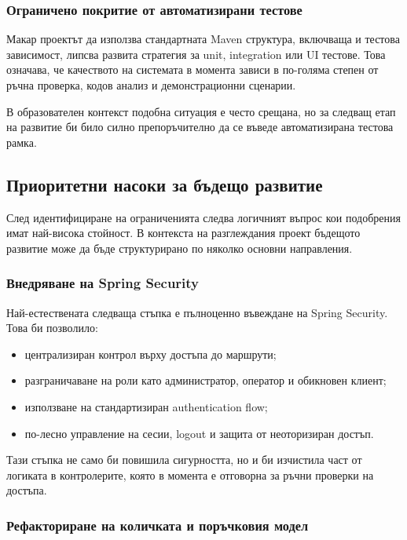 \subsubsection{Ограничено покритие от автоматизирани тестове}

Макар проектът да използва стандартната Maven структура, включваща и тестова зависимост, липсва развита стратегия за unit, integration или UI тестове. Това означава, че качеството на системата в момента зависи в по-голяма степен от ръчна проверка, кодов анализ и демонстрационни сценарии.

В образователен контекст подобна ситуация е често срещана, но за следващ етап на развитие би било силно препоръчително да се въведе автоматизирана тестова рамка.

\subsection{Приоритетни насоки за бъдещо развитие}

След идентифициране на ограниченията следва логичният въпрос кои подобрения имат най-висока стойност. В контекста на разглеждания проект бъдещото развитие може да бъде структурирано по няколко основни направления.

\subsubsection{Внедряване на Spring Security}

Най-естествената следваща стъпка е пълноценно въвеждане на Spring Security. Това би позволило:

\begin{itemize}[leftmargin=*]
    \item централизиран контрол върху достъпа до маршрути;
    \item разграничаване на роли като администратор, оператор и обикновен клиент;
    \item използване на стандартизиран authentication flow;
    \item по-лесно управление на сесии, logout и защита от неоторизиран достъп.
\end{itemize}

Тази стъпка не само би повишила сигурността, но и би изчистила част от логиката в контролерите, която в момента е отговорна за ръчни проверки на достъпа.

\subsubsection{Рефакториране на количката и поръчковия модел}

